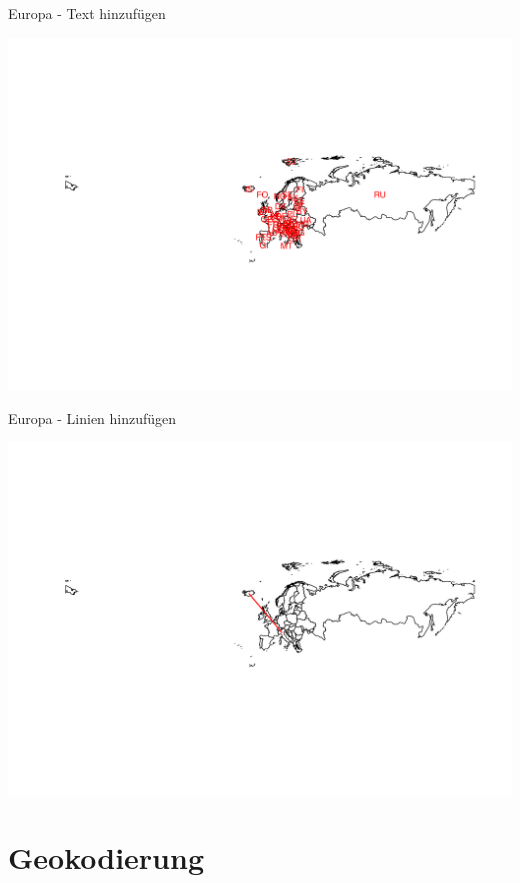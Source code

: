 \documentclass[ignorenonframetext,]{beamer}
\begin{document}
\begin{frame}{Europa - Text hinzufügen}

\includegraphics{Geomedizin_files/figure-beamer/unnamed-chunk-107-1.pdf}

\end{frame}

\begin{frame}{Europa - Linien hinzufügen}

\includegraphics{Geomedizin_files/figure-beamer/unnamed-chunk-109-1.pdf}

\end{frame}

\section{Geokodierung}\label{geokodierung}
\end{document}
